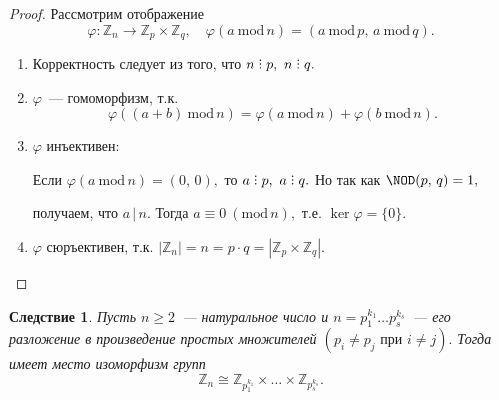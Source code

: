 \documentclass[a4paper, 14pt]{extarticle}
\newcommand{\n}{\par}
\newcommand{\integers}{\mathbb{Z}}
\DeclareRobustCommand{\divby}{%
	\mathrel{\text{\vbox{\baselineskip.65ex\lineskiplimit0pt\hbox{.}\hbox{.}\hbox{.}}}}%
}
\renewcommand{\phi}{\varphi}
\renewcommand{\mod}{\mathrm{mod} \,}
\theoremstyle{definition}
\theoremstyle{plain}
\numberwithin{theorem}{section}
\numberwithin{definition}{section}
\numberwithin{statement}{section}
\numberwithin{lemma}{section}
\newtheorem*{consequence*}{Следствие}
\numberwithin{consequence}{section}
\begin{document}
	\begin{proof}
		Рассмотрим отображение
		\begin{equation*}
			\phi: \integers_n \rightarrow \integers_p \times \integers_q, \quad \phi(a \ \mod n) = (a \ \mod p, \, a \ \mod q).
		\end{equation*}
		\begin{enumerate}
			\setlength\itemsep{0.1em}
			\item Корректность следует из того, что $n \divby p, \ n \divby q.$
			\item $\phi$~--- гомоморфизм, т.к.
			\begin{equation*}
				\phi((a + b) \ \mod n) = \phi(a \ \mod n) + \phi(b \ \mod n).
			\end{equation*}
			\item $\phi$ инъективен: \n
			Если ${\phi(a \ \mod n) =(0, \, 0),}$ то ${a \divby p, \ a \divby q.}$ Но так как ${\NOD(p, \, q) = 1,}$ \n
			получаем, что $a \, | \, n.$ Тогда ${a \equiv 0 \ (\mod n),}$ т.е. ${\ker \phi = \{0\}.}$
			\item $\phi$ сюръективен, т.к. ${|\integers_n| = n = p \cdot q = |\integers_p \times \integers_q|.}$ \qedhere
		\end{enumerate}
	\end{proof}
	\begin{consequence*}
		Пусть ${n \geqslant 2}$~--- натуральное число и ${n = p^{k_1}_1 \ldots p^{k_s}_s}$~--- его разложение в произведение простых множителей ${(p_i \neq p_j \text{ при } i \neq j).}$ Тогда имеет место изоморфизм групп
		\begin{equation*}
			\integers_n \cong \integers_{p^{k_1}_1} \times \ldots \times \integers_{p^{k_s}_s}.
		\end{equation*}
	\end{consequence*}
        \newpage
\end{document}
